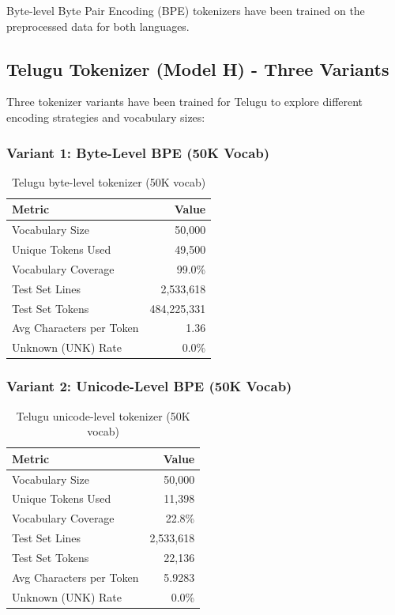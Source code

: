 \documentclass[11pt,a4paper]{article}
\begin{document}
Byte-level Byte Pair Encoding (BPE) tokenizers have been trained on the preprocessed data for both languages.

\subsection{Telugu Tokenizer (Model H) - Three Variants}

Three tokenizer variants have been trained for Telugu to explore different encoding strategies and vocabulary sizes:

\subsubsection{Variant 1: Byte-Level BPE (50K Vocab)}

\begin{table}[H]
    \centering
    \small
    \begin{tabular}{|l|r|}
    \hline
    \textbf{Metric} & \textbf{Value} \\
    \hline
    Vocabulary Size & 50,000 \\
    Unique Tokens Used & 49,500 \\
    Vocabulary Coverage & 99.0\% \\
    \hline
    Test Set Lines & 2,533,618 \\
    Test Set Tokens & 484,225,331 \\
    Avg Characters per Token & 1.36 \\
    Unknown (UNK) Rate & 0.0\% \\
    \hline
    \end{tabular}
    \caption{Telugu byte-level tokenizer (50K vocab)}
    \label{tab:tokenizer_telugu_byte}
\end{table}

\subsubsection{Variant 2: Unicode-Level BPE (50K Vocab)}

\begin{table}[H]
    \centering
    \small
    \begin{tabular}{|l|r|}
    \hline
    \textbf{Metric} & \textbf{Value} \\
    \hline
    Vocabulary Size & 50,000 \\
    Unique Tokens Used & 11,398 \\
    Vocabulary Coverage & 22.8\% \\
    \hline
    Test Set Lines & 2,533,618 \\
    Test Set Tokens & 22,136 \\
    Avg Characters per Token & 5.9283 \\
    Unknown (UNK) Rate & 0.0\% \\
    \hline
    \end{tabular}
    \caption{Telugu unicode-level tokenizer (50K vocab)}
    \label{tab:tokenizer_telugu_unicode}
\end{table}
\end{document}
